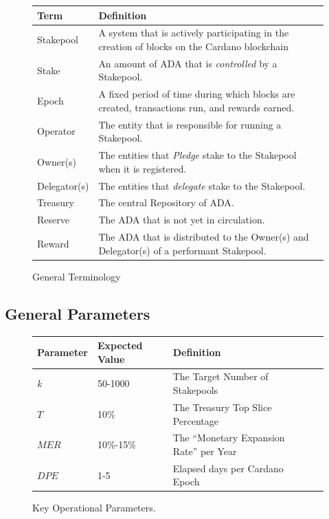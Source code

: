 \documentclass[11pt,a4paper,dvipsnames,twosided,final]{article}
\newcommand{\ada}{ADA{}}
\newcommand{\cardano}[1]{Cardano}
\begin{document}
\begin{figure}[t]
  \begin{center}
\begin{tabular}{||l|p{12cm}||}
  \hline \hline
\textbf{Term} & \textbf{Definition} \\\hline
  Stakepool & A system that is actively participating in the creation of blocks on the \cardano{} blockchain  \\\hline
  Stake & An amount of \ada{} that is \emph{controlled} by a Stakepool.\\\hline
  Epoch & A fixed period of time during which blocks are created, transactions run, and rewards earned.\\\hline
Operator & The entity that is responsible for running a Stakepool. \\\hline
Owner(s) & The entities that \emph{Pledge} stake to the Stakepool when it is registered. \\\hline
  Delegator(s) & The entities that \emph{delegate} stake to the Stakepool.\\\hline
  Treasury & The central Repository of \ada.\\\hline
  Reserve & The \ada{} that is not yet in circulation.\\\hline
  Reward & The \ada{} that is distributed to the Owner(s) and Delegator(s) of a performant Stakepool.\\\hline
  \hline
\end{tabular}
\end{center}
\caption{General Terminology}
\label{fig:terminology}
\end{figure}

\newpage
\subsection{General Parameters}

\begin{figure}[h!]
\begin{center}
\begin{tabular}{||l|l|p{10cm}|l||}
  \hline \hline
\textbf{Parameter} & \textbf{Expected Value} & \textbf{Definition} \\\hline
\emph{k} & 50-1000 & The Target Number of Stakepools \\\hline
$T$ & 10\% & The Treasury Top Slice Percentage \\\hline
$\textit{MER}$ & 10\%-15\% &  The ``Monetary Expansion Rate'' per Year \\\hline
$\textit{DPE}$ & 1-5 &  Elapsed days per \cardano{} Epoch \\\hline
  \hline
\end{tabular}
\end{center}
\caption{Key Operational Parameters.}
\end{figure}
\end{document}
